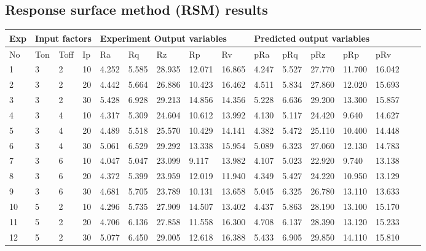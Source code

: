 \documentclass[suppldata]{interact}
\begin{document}
\subsection{ Response surface method (RSM) results}
     \begin{minipage}{1\textwidth}
       \small
        \begin{tabular}{|p{1.2em}|p{1.2em}|p{1.2em}|l|l|l|l|l|l|l|l|l|l|l|l|l|}  \hline  
         Exp & \multicolumn{3}{l|}{Input factors} & \multicolumn{5}{l|}{ Experiment Output variables}&\multicolumn{5}{l|}{ Predicted output variables}\\ \hline
        No& Ton & Toff & Ip & Ra & Rq & Rz & Rp & Rv  & pRa & pRq & pRz & pRp & pRv  \\ \hline
        1 & 3 & 2 & 10 & 4.252 & 5.585 & 28.935 & 12.071 & 16.865 & 4.247 & 5.527 & 27.770 & 11.700 & 16.042 \\ \hline
        2 & 3 & 2 & 20 & 4.442 & 5.664 & 26.886 & 10.423 & 16.462 & 4.511 & 5.834 & 27.860 & 12.020 & 15.693 \\ \hline
        3 & 3 & 2 & 30 & 5.428 & 6.928 & 29.213 & 14.856 & 14.356 & 5.228 & 6.636 & 29.200 & 13.300 & 15.857 \\ \hline
        4 & 3 & 4 & 10 & 4.317 & 5.309 & 24.604 & 10.612 & 13.992 & 4.130 & 5.117 & 24.420 & 9.640 & 14.627 \\ \hline
        5 & 3 & 4 & 20 & 4.489 & 5.518 & 25.570 & 10.429 & 14.141 & 4.382 & 5.472 & 25.110 & 10.400 & 14.448 \\ \hline
        6 & 3 & 4 & 30 & 5.061 & 6.529 & 29.292 & 13.338 & 15.954 & 5.089 & 6.323 & 27.060 & 12.130 & 14.783 \\ \hline
        7 & 3 & 6 & 10 & 4.047 & 5.047 & 23.099 & 9.117 & 13.982 & 4.107 & 5.023 & 22.920 & 9.740 & 13.138 \\ \hline
        8 & 3 & 6 & 20 & 4.372 & 5.399 & 23.959 & 12.019 & 11.940 & 4.349 & 5.427 & 24.220 & 10.950 & 13.129 \\ \hline
        9 & 3 & 6 & 30 & 4.681 & 5.705 & 23.789 & 10.131 & 13.658 & 5.045 & 6.325 & 26.780 & 13.110 & 13.633 \\ \hline
        10 & 5 & 2 & 10 & 4.296 & 5.735 & 27.909 & 14.507 & 13.402 & 4.437 & 5.863 & 28.190 & 13.100 & 15.170 \\ \hline
        11 & 5 & 2 & 20 & 4.706 & 6.136 & 27.858 & 11.558 & 16.300 & 4.708 & 6.137 & 28.390 & 13.120 & 15.233 \\ \hline
        12 & 5 & 2 & 30 & 5.077 & 6.450 & 29.005 & 12.618 & 16.388 & 5.433 & 6.905 & 29.850 & 14.110 & 15.810 \\ \hline

\end{tabular}
\end{minipage}
\end{document}

